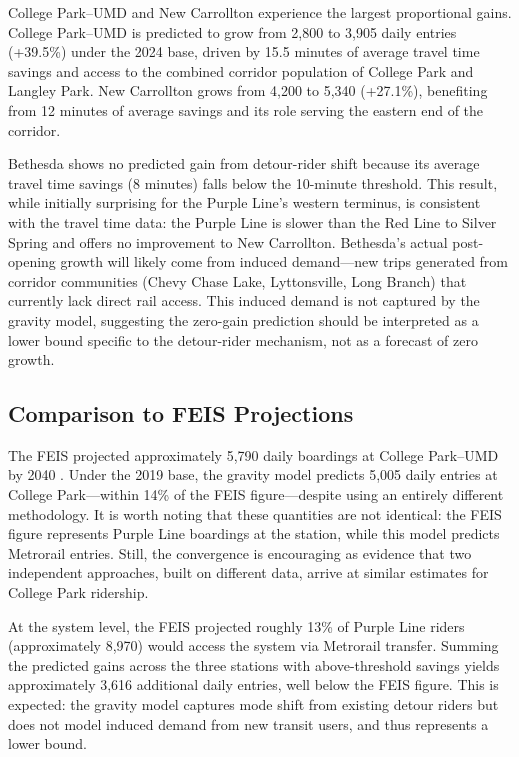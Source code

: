 \documentclass[11pt]{article}
\begin{document}
College Park--UMD and New Carrollton experience the largest proportional
gains. College Park--UMD is predicted to grow from 2,800 to 3,905 daily
entries (+39.5\%) under the 2024 base, driven by 15.5 minutes of average
travel time savings and access to the combined corridor population of
College Park and Langley Park. New Carrollton grows from 4,200 to 5,340
(+27.1\%), benefiting from 12 minutes of average savings and its role
serving the eastern end of the corridor.

Bethesda shows no predicted gain from detour-rider shift because its
average travel time savings (8 minutes) falls below the 10-minute
threshold. This result, while initially surprising for the Purple Line's
western terminus, is consistent with the travel time data: the Purple Line
is slower than the Red Line to Silver Spring and offers no improvement to
New Carrollton. Bethesda's actual post-opening growth will likely come from
induced demand---new trips generated from corridor communities (Chevy Chase
Lake, Lyttonsville, Long Branch) that currently lack direct rail access.
This induced demand is not captured by the gravity model, suggesting the
zero-gain prediction should be interpreted as a lower bound specific to the
detour-rider mechanism, not as a forecast of zero growth.

\subsection{Comparison to FEIS Projections}

The FEIS projected approximately 5,790 daily boardings at College
Park--UMD by 2040 \citep{collegeparkhousing}. Under the 2019 base, the
gravity model predicts 5,005 daily entries at College Park---within 14\%
of the FEIS figure---despite using an entirely different methodology. It is
worth noting that these quantities are not identical: the FEIS figure
represents Purple Line boardings at the station, while this model predicts
Metrorail entries. Still, the convergence is encouraging as evidence that
two independent approaches, built on different data, arrive at similar
estimates for College Park ridership.

At the system level, the FEIS projected roughly 13\% of Purple Line riders
(approximately 8,970) would access the system via Metrorail transfer.
Summing the predicted gains across the three stations with above-threshold
savings yields approximately 3,616 additional daily entries, well below
the FEIS figure. This is expected: the gravity model captures mode shift
from existing detour riders but does not model induced demand from new
transit users, and thus represents a lower bound.
\end{document}
